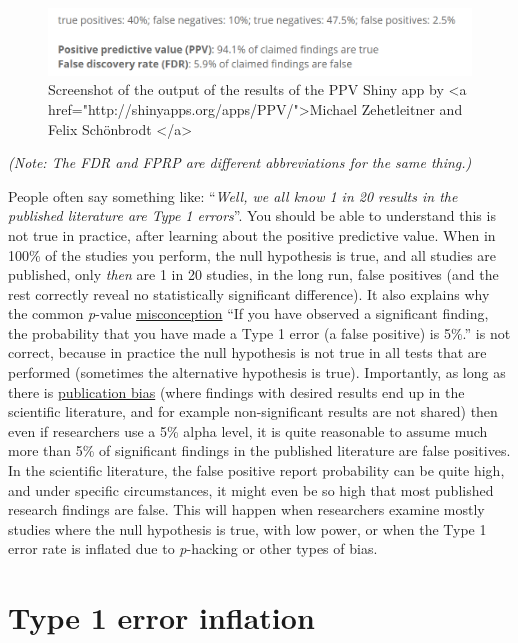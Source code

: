 \documentclass[
  oneside]{krantz}
\begin{document}
\begin{figure}

{\centering \includegraphics[width=1\linewidth]{images/PPVexample} 

}

\caption{Screenshot of the output of the results of the PPV Shiny app by <a href="http://shinyapps.org/apps/PPV/">Michael Zehetleitner and Felix Schönbrodt </a>}\label{fig:ppvexample}
\end{figure}

\emph{(Note: The FDR and FPRP are different abbreviations for the same thing.)}

People often say something like: ``\emph{Well, we all know 1 in 20 results in the published literature are Type 1 errors}''. You should be able to understand this is not true in practice, after learning about the positive predictive value. When in 100\% of the studies you perform, the null hypothesis is true, and all studies are published, only \emph{then} are 1 in 20 studies, in the long run, false positives (and the rest correctly reveal no statistically significant difference). It also explains why the common \emph{p}-value \protect\hyperlink{misconception4}{misconception} ``If you have observed a significant finding, the probability that you have made a Type 1 error (a false positive) is 5\%.'' is not correct, because in practice the null hypothesis is not true in all tests that are performed (sometimes the alternative hypothesis is true). Importantly, as long as there is \protect\hyperlink{bias}{publication bias} (where findings with desired results end up in the scientific literature, and for example non-significant results are not shared) then even if researchers use a 5\% alpha level, it is quite reasonable to assume much more than 5\% of significant findings in the published literature are false positives. In the scientific literature, the false positive report probability can be quite high, and under specific circumstances, it might even be so high that most published research findings are false. This will happen when researchers examine mostly studies where the null hypothesis is true, with low power, or when the Type 1 error rate is inflated due to \emph{p}-hacking or other types of bias.

\hypertarget{type-1-error-inflation}{%
\section{Type 1 error inflation}\label{type-1-error-inflation}}
\end{document}
